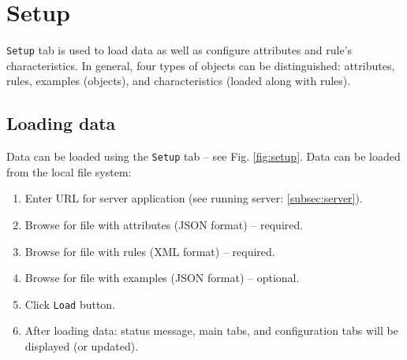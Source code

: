 \documentclass[12pt]{article}
\begin{document}
%
%

\pagebreak

\section{Setup}

\texttt{Setup} tab is used to load data as well as configure attributes and rule's characteristics. In general, four types of objects can be distinguished: attributes, rules, examples (objects), and characteristics (loaded along with rules). 

\subsection{Loading data}
Data can be loaded using the \texttt{Setup} tab -- see Fig. \ref{fig:setup}.
Data can be loaded from the local file system:
\begin{enumerate}
    \setlength\itemsep{0em}
    \item Enter URL for server application (see running server: \ref{subsec:server}).
    \item Browse for file with attributes (JSON format) -- required.
    \item Browse for file with rules (XML format) -- required.
    \item Browse for file with examples (JSON format) -- optional.
    \item Click \texttt{Load} button.
    \item After loading data: status message, main tabs, and configuration tabs will be displayed (or updated).
\end{enumerate}
\end{document}
